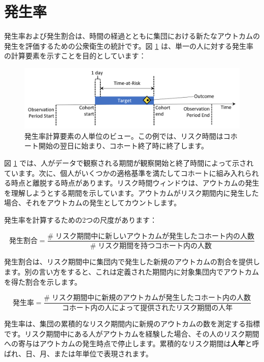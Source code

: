 \documentclass[
  11pt]{book}
\theoremstyle{definition}
\theoremstyle{definition}
\theoremstyle{definition}
\theoremstyle{definition}
\theoremstyle{remark}
\begin{document}
\section{発生率}\label{ux767aux751fux7387}

発生率および発生割合は、時間の経過とともに集団における新たなアウトカムの発生を評価するための公衆衛生の統計です。図 \ref{fig:incidenceTimeline} は、単一の人に対する発生率の計算要素を示すことを目的としています： 

\begin{figure}

{\centering \includegraphics[width=1\linewidth]{images/Characterization/incidenceTimeline} 

}

\caption{発生率計算要素の人単位のビュー。この例では、リスク時間はコホート開始の翌日に始まり、コホート終了時に終了します。}\label{fig:incidenceTimeline}
\end{figure}

図 \ref{fig:incidenceTimeline} では、人がデータで観察される期間が観察開始と終了時間によって示されています。次に、個人がいくつかの適格基準を満たしてコホートに組み入れられる時点と離脱する時点があります。リスク時間ウィンドウは、アウトカムの発生を理解しようとする期間を示しています。アウトカムがリスク期間内に発生した場合、それをアウトカムの発生としてカウントします。

発生率を計算するための2つの尺度があります：

\[
発生割合 = \frac{\#\;リスク期間中に新しいアウトカムが発生したコホート内の人数}{\#\;リスク期間を持つコホート内の人数}
\]

発生割合は、リスク期間中に集団内で発生した新規のアウトカムの割合を提供します。別の言い方をすると、これは定義された期間内に対象集団内でアウトカムを得た割合を示します。

\[
発生率 = \frac{\#\;リスク期間中に新規のアウトカムが発生したコホート内の人数}{コホート内の人によって提供されたリスク期間の人年}
\]

発生率は、集団の累積的なリスク期間内に新規のアウトカムの数を測定する指標です。リスク期間中にある人がアウトカムを経験した場合、その人のリスク期間への寄与はアウトカムの発生時点で停止します。累積的なリスク期間は\textbf{人年}と呼ばれ、日、月、または年単位で表現されます。 
\end{document}
